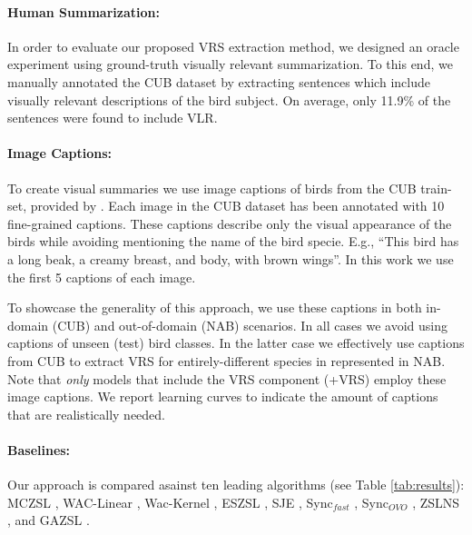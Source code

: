 \documentclass[11pt,a4paper]{article}
\begin{document}
\paragraph{Human Summarization:} 
In order to evaluate our proposed VRS extraction method, we designed an oracle experiment using ground-truth visually relevant summarization. To this end, we manually annotated the CUB dataset by extracting sentences which include visually relevant descriptions of the bird subject. On average, only 11.9\% of the sentences were found to include VLR.  

\paragraph{Image Captions:}
To create visual summaries we use image captions of birds from the CUB train-set, provided by \citet{reed2016learning}.  Each image in the CUB dataset has been annotated with 10 fine-grained captions. These captions describe only the visual appearance of the birds while avoiding mentioning the name of the bird specie. E.g., \enquote{This bird has a long beak, a creamy breast, and body, with brown wings}. In this work we use the first 5 captions of each image.


To showcase the generality of this approach, we use these captions in both in-domain (CUB) and out-of-domain (NAB) scenarios. In all cases we avoid using captions of unseen (test) bird classes.  In the latter case we effectively use captions from CUB to extract VRS for entirely-different species in represented in NAB.  Note that {\em only} models that include the VRS component (+VRS) employ these image captions. We report learning curves to indicate the amount of captions that are realistically needed.





\paragraph{Baselines:}  
Our approach is compared asainst ten leading algorithms (see Table \ref{tab:results}): MCZSL \citep{akata2016multi}, WAC-Linear  \citep{elhoseiny2013write}, Wac-Kernel   \citep{elhoseiny2016write}, ESZSL     \citep{romera2015embarrassingly}, SJE   \citep{akata2015evaluation}, Sync$_{fast}$ \citep{changpinyo2016synthesized}, Sync$_{OVO}$ \citep{changpinyo2016synthesized},
ZSLNS \citep{qiao2016less}, and GAZSL \citep{zhu2018generative}. 
\end{document}
